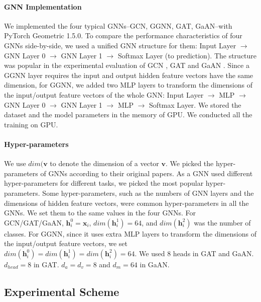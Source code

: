 \paragraph{GNN Implementation}
We implemented the four typical GNNs--GCN, GGNN, GAT, GaAN--with PyTorch Geometric 1.5.0.
To compare the performance characteristics of four GNNs side-by-side, we used a unified GNN structure for them: Input Layer $\rightarrow$ GNN Layer 0 $\rightarrow$ GNN Layer 1 $\rightarrow$ Softmax Layer (to prediction).
The structure was popular in the experimental evaluation of GCN \cite{kipf2017_gcn}, GAT \cite{huang2018_gat} and GaAN \cite{zhang2018_gaan}.
Since a GGNN layer requires the input and output hidden feature vectors have the same dimension, for GGNN, we added two MLP layers to transform the dimensions of the input/output feature vectors of the whole GNN: Input Layer $\rightarrow$ MLP $\rightarrow$ GNN Layer 0 $\rightarrow$ GNN Layer 1 $\rightarrow$ MLP $\rightarrow$ Softmax Layer.
We stored the dataset and the model parameters in the memory of GPU.
We conducted all the training on GPU.

\paragraph{Hyper-parameters}
We use $dim(\boldsymbol{v}$ to denote the dimension of a vector $\boldsymbol{v}$.
We picked the hyper-parameters of GNNs according to their original papers.
As a GNN used different hyper-parameters for different tasks, we picked the most popular hyper-parameters.
Some hyper-parameters, such as the numbers of GNN layers and the dimensions of hidden feature vectors, were common hyper-parameters in all the GNNs.
We set them to the same values in the four GNNs.
For GCN/GAT/GaAN, $\boldsymbol{h}^0_i = \boldsymbol{x}_i$, $dim(\boldsymbol{h}^1_i)=64$, and $dim(\boldsymbol{h}^2_i)$ was the number of classes.
For GGNN, since it uses extra MLP layers to transform the dimensions of the input/output feature vectors, we set $dim(\boldsymbol{h}^0_i) = dim(\boldsymbol{h}^1_i) = dim(\boldsymbol{h}^2_i) = 64$.
We used 8 heads in GAT and GaAN.
$d_{head}=8$ in GAT.
$d_a=d_v=8$ and $d_m=64$ in GaAN.

\subsection{Experimental Scheme}
\label{sec:experimental_scheme}

